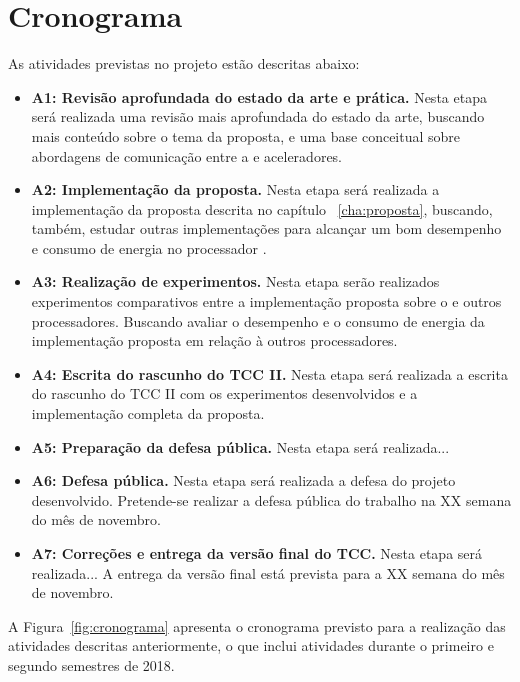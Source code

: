 \chapter{Cronograma}

As atividades previstas no projeto estão descritas abaixo:


\begin{itemize}
    \item \textbf{A1: Revisão aprofundada do estado da arte e prática.} Nesta etapa será
        realizada uma revisão mais aprofundada do estado da arte, buscando mais
        conteúdo sobre o tema da proposta, e uma base conceitual sobre abordagens de
        comunicação entre a \cpu e aceleradores.
    \item \textbf{A2: Implementação da proposta.} Nesta etapa será realizada a
        implementação da proposta descrita no capítulo ~\ref{cha:proposta},
        buscando, também, estudar outras implementações para alcançar um bom
        desempenho e consumo de energia no processador \mppa.
    \item \textbf{A3: Realização de experimentos.} Nesta etapa serão realizados
        experimentos comparativos entre a implementação proposta sobre o \mppa e
        outros processadores. Buscando avaliar o desempenho e o consumo de
        energia da implementação proposta em relação à outros processadores.
    \item \textbf{A4: Escrita do rascunho do TCC II.} Nesta etapa será realizada
        a escrita do rascunho do TCC II com os experimentos desenvolvidos e a
        implementação completa da proposta.
    \item \textbf{A5: Preparação da defesa pública.} Nesta etapa será realizada...
    \item \textbf{A6: Defesa pública.} Nesta etapa será realizada a defesa do projeto desenvolvido. Pretende-se realizar a defesa pública do trabalho na XX semana do mês de novembro.
    \item \textbf{A7: Correções e entrega da versão final do TCC.} Nesta etapa será realizada... A entrega da versão final está prevista para a XX semana do mês de novembro.
\end{itemize}

A Figura~\ref{fig:cronograma} apresenta o cronograma previsto para a realização das atividades descritas anteriormente, o que inclui atividades durante o primeiro e segundo semestres de 2018.

